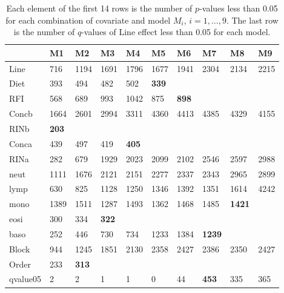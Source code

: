 \documentclass[12pt, letter]{article}\usepackage[]{graphicx}\usepackage[]{color}
\begin{document}
\begin{table}
\centering
\begin{tabular}{|l|l|l|l|l|l|l|l|l|l|}
  \hline
 & M1 & M2 & M3 & M4 & M5 & M6 & M7 & M8 & M9 \\ 
  \hline
Line & 716 & 1194 & 1691 & 1796 & 1677 & 1941 & 2304 & 2134 & 2215 \\ 
   \hline
Diet & 393 & 494 & 482 & 502 & \textbf{339} &  &  &  &  \\ 
   \hline
RFI & 568 & 689 & 993 & 1042 & 875 & \textbf{898} &  &  &  \\ 
   \hline
Concb & 1664 & 2601 & 2994 & 3311 & 4360 & 4413 & 4385 & 4329 & 4155 \\ 
   \hline
RINb & \textbf{203} &  &  &  &  &  &  &  &  \\ 
   \hline
Conca & 439 & 497 & 419 & \textbf{405} &  &  &  &  &  \\ 
   \hline
RINa & 282 & 679 & 1929 & 2023 & 2099 & 2102 & 2546 & 2597 & 2988 \\ 
   \hline
neut & 1111 & 1676 & 2121 & 2151 & 2277 & 2337 & 2343 & 2965 & 2899 \\ 
   \hline
lymp & 630 & 825 & 1128 & 1250 & 1346 & 1392 & 1351 & 1614 & 4242 \\ 
   \hline
mono & 1389 & 1511 & 1287 & 1493 & 1362 & 1468 & 1485 & \textbf{1421} &  \\ 
   \hline
eosi & 300 & 334 & \textbf{322} &  &  &  &  &  &  \\ 
   \hline
baso & 252 & 446 & 730 & 734 & 1233 & 1384 & \textbf{1239} &  &  \\ 
   \hline
Block & 944 & 1245 & 1851 & 2130 & 2358 & 2427 & 2386 & 2350 & 2427 \\ 
   \hline
Order & 233 & \textbf{313} &  &  &  &  &  &  &  \\ 
   \hline
qvalue05 & 2 & 2 & 1 & 1 & 0 & 44 & \textbf{453} & 335 & 365 \\ 
   \hline
\end{tabular}
\caption{Each element of the first 14 rows is the number of $p$-values less than 0.05 for each combination of covariate and model $M_i$, $i = 1, \dots, 9$. The last row is the number of $q$-values  of Line effect less than 0.05 for each model. } 
\label{realdatatablepvalue}
\end{table}
\end{document}
